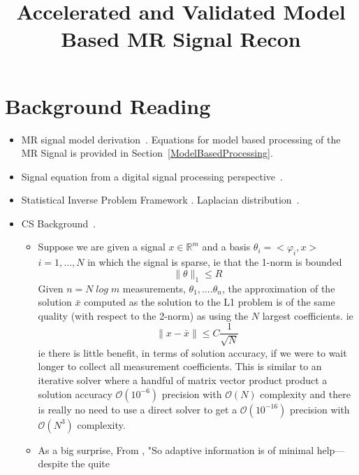 \documentclass[10pt]{amsart}
\title{Accelerated and Validated Model Based MR Signal Recon}
\begin{document}
\maketitle

\section{Background Reading}
  \begin{itemize}
    \item MR signal model derivation~\cite{Haacke1999,Bernstein2004}.
          Equations for model based processing of the MR Signal is provided in Section~\ref{ModelBasedProcessing}.
    \item Signal equation from a digital signal processing perspective~\cite{candy2005model}. 
    \item Statistical Inverse Problem Framework \cite{tarantola05}.  
          Laplacian distribution~\cite{Eltoft2006,Babacan2010}.
    \item CS Background~\cite{Fessler2010b,Donoho2006a,Candes2008}.
  \begin{itemize}
    \item  Suppose we are given a signal $x \in \mathbb{R}^m$ and a basis
           $\theta_i = <\varphi_i,x> $ $i = 1,...,N$ in which the signal is
           sparse, ie that  the 1-norm is bounded
           \[
              \|\theta\|_1 \leq R
           \]
           Given $n = N \; log \;m $ measurements, $\theta_1, .... \theta_n$, the approximation
           of the solution $\bar{x}$ computed as the solution to the L1
           problem is of the same quality (with respect to the 2-norm) as 
           using the $N$ largest coefficients. ie 
           \[
             \| x - \bar{x}\| \leq C  \frac{1}{\sqrt{N}}
           \]
           ie there is little benefit, in terms of solution accuracy, if we
           were to wait longer to collect all measurement coefficients.
           This is similar to an iterative solver where a handful of matrix
vector product product a solution accuracy $\mathcal{O}(10^{-6})$ precision with $\mathcal{O}(N)$ 
complexity and there is really no need to use a direct solver
to get a $\mathcal{O}(10^{-16})$ precision with $\mathcal{O}(N^3)$
complexity. 
     \item As a big surprise, From \cite{Donoho2006a}, "So adaptive information is of minimal help—despite the quite

\end{itemize}
\end{itemize}
\end{document}
